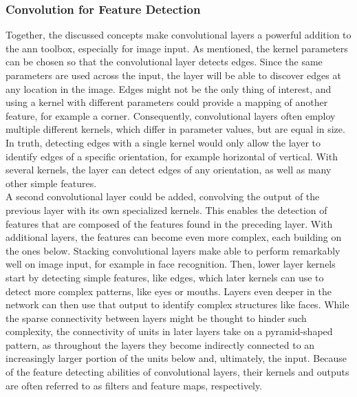 \subsubsection{Convolution for Feature Detection}

Together, the discussed concepts make convolutional layers a powerful addition to the \acrshort{ann} toolbox, especially for image input. As mentioned, the kernel parameters can be chosen so that the convolutional layer detects edges. Since the same parameters are used across the input, the layer will be able to discover edges at any location in the image. Edges might not be the only thing of interest, and using a kernel with different parameters could provide a mapping of another feature, for example a corner. Consequently, convolutional layers often employ multiple different kernels, which differ in parameter values, but are equal in size. In truth, detecting edges with a single kernel would only allow the layer to identify edges of a specific orientation, for example horizontal of vertical. With several kernels, the layer can detect edges of any orientation, as well as many other simple features. \\

\noindent A second convolutional layer could be added, convolving the output of the previous layer with its own specialized kernels. This enables the detection of features that are composed of the features found in the preceding layer. With additional layers, the features can become even more complex, each building on the ones below. Stacking convolutional layers make  able to perform remarkably well on image input, for example in face recognition. Then, lower layer kernels start by detecting simple features, like edges, which later kernels can use to detect more complex patterns, like eyes or mouths. Layers even deeper in the network can then use that output to identify complex structures like faces. While the sparse connectivity between layers might be thought to hinder such complexity, the connectivity of units in later layers take on a pyramid-shaped pattern, as throughout the layers they become indirectly connected to an increasingly larger portion of the units below and, ultimately, the input. Because of the feature detecting abilities of convolutional layers, their kernels and outputs are often referred to as filters and feature maps, respectively. \\

